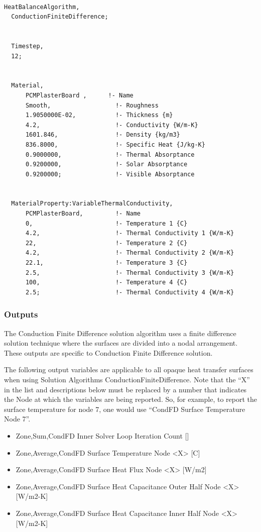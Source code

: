 \begin{lstlisting}

HeatBalanceAlgorithm,
  ConductionFiniteDifference;


  Timestep,
  12;


  Material,
      PCMPlasterBoard ,      !- Name
      Smooth,                  !- Roughness
      1.9050000E-02,           !- Thickness {m}
      4.2,                     !- Conductivity {W/m-K}
      1601.846,                !- Density {kg/m3}
      836.8000,                !- Specific Heat {J/kg-K}
      0.9000000,               !- Thermal Absorptance
      0.9200000,               !- Solar Absorptance
      0.9200000;               !- Visible Absorptance


  MaterialProperty:VariableThermalConductivity,
      PCMPlasterBoard,         !- Name
      0,                       !- Temperature 1 {C}
      4.2,                     !- Thermal Conductivity 1 {W/m-K}
      22,                      !- Temperature 2 {C}
      4.2,                     !- Thermal Conductivity 2 {W/m-K}
      22.1,                    !- Temperature 3 {C}
      2.5,                     !- Thermal Conductivity 3 {W/m-K}
      100,                     !- Temperature 4 {C}
      2.5;                     !- Thermal Conductivity 4 {W/m-K}
\end{lstlisting}

\subsubsection{Outputs}\label{outputs-1-026}

The Conduction Finite Difference solution algorithm uses a finite difference solution technique where the surfaces are divided into a nodal arrangement. These outputs are specific to Conduction Finite Difference solution.

The following output variables are applicable to all opaque heat transfer surfaces when using Solution Algorithms ConductionFiniteDifference.  Note that the ``X'' in the list and descriptions below must be replaced by a number that indicates the Node at which the variables are being reported.  So, for example, to report the surface temperature for node 7, one would use ``CondFD Surface Temperature Node 7''.

\begin{itemize}
\item
  Zone,Sum,CondFD Inner Solver Loop Iteration Count {[]}
\item
  Zone,Average,CondFD Surface Temperature Node \textless{}X\textgreater{} {[}C{]}
\item
  Zone,Average,CondFD Surface Heat Flux Node \textless{}X\textgreater{} {[}W/m2{]}
\item
  Zone,Average,CondFD Surface Heat Capacitance Outer Half Node \textless{}X\textgreater{} {[}W/m2-K{]}
\item
  Zone,Average,CondFD Surface Heat Capacitance Inner Half Node \textless{}X\textgreater{} {[}W/m2-K{]}
\end{itemize}

